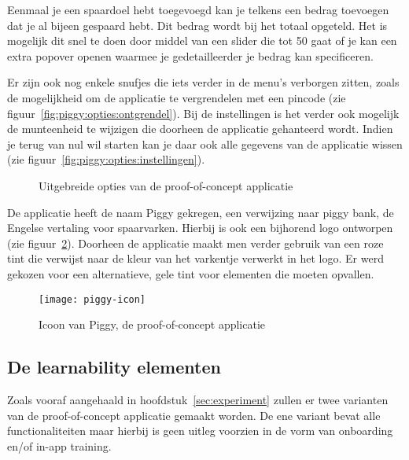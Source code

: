 Eenmaal je een spaardoel hebt toegevoegd kan je telkens een bedrag toevoegen dat je al bijeen gespaard hebt. Dit bedrag wordt bij het totaal opgeteld. Het is mogelijk dit snel te doen door middel van een slider die tot 50 gaat of je kan een extra popover openen waarmee je gedetailleerder je bedrag kan specificeren.

Er zijn ook nog enkele snufjes die iets verder in de menu's verborgen zitten, zoals de mogelijkheid om de applicatie te vergrendelen met een pincode (zie figuur~\ref{fig:piggy:opties:ontgrendel}). Bij de instellingen is het verder ook mogelijk de munteenheid te wijzigen die doorheen de applicatie gehanteerd wordt. Indien je terug van nul wil starten kan je daar ook alle gegevens van de applicatie wissen (zie figuur~\ref{fig:piggy:opties:instellingen}).

\begin{figure}[h!]
    \centering
    \qquad
    \caption{Uitgebreide opties van de proof-of-concept applicatie}
    \label{fig:piggy:opties}
\end{figure}

De applicatie heeft de naam Piggy gekregen, een verwijzing naar piggy bank, de Engelse vertaling voor spaarvarken. Hierbij is ook een bijhorend logo ontworpen (zie figuur~\ref{fig:piggy:icoon}). Doorheen de applicatie maakt men verder gebruik van een roze tint die verwijst naar de kleur van het varkentje verwerkt in het logo. Er werd gekozen voor een alternatieve, gele tint voor elementen die moeten opvallen.

\begin{figure}[h!]
    \centering
    \texttt{[image: piggy-icon]}
    \caption{Icoon van Piggy, de proof-of-concept applicatie}
    \label{fig:piggy:icoon}
\end{figure}

\subsection{De learnability elementen}
\label{sec:applicatie:learnability-elementen}

Zoals vooraf aangehaald in hoofdstuk~\ref{sec:experiment} zullen er twee varianten van de proof-of-concept applicatie gemaakt worden. De ene variant bevat alle functionaliteiten maar hierbij is geen uitleg voorzien in de vorm van onboarding en/of in-app training.

